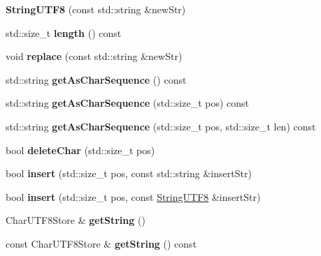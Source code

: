 \begin{DoxyCompactItemize}
{\bfseries String\+U\+T\+F8} (const std\+::string \&new\+Str)
\item 
\mbox{\label{classStringUtils_1_1StringUTF8_a6f80c06b04e4954beafcd93e1f817b43}} 
std\+::size\+\_\+t {\bfseries length} () const
\item 
\mbox{\label{classStringUtils_1_1StringUTF8_aa22f0f8d7851e83f3fe742b08829b0fd}} 
void {\bfseries replace} (const std\+::string \&new\+Str)
\item 
\mbox{\label{classStringUtils_1_1StringUTF8_a95e853e98fd631a912c2364ecb97e94d}} 
std\+::string {\bfseries get\+As\+Char\+Sequence} () const
\item 
\mbox{\label{classStringUtils_1_1StringUTF8_af4918f9c9d489ae5ee522dcfc1b6013f}} 
std\+::string {\bfseries get\+As\+Char\+Sequence} (std\+::size\+\_\+t pos) const
\item 
\mbox{\label{classStringUtils_1_1StringUTF8_a96ef87d3ff9d0847a4053ef5bdee0bf6}} 
std\+::string {\bfseries get\+As\+Char\+Sequence} (std\+::size\+\_\+t pos, std\+::size\+\_\+t len) const
\item 
\mbox{\label{classStringUtils_1_1StringUTF8_a7bc7fa3962cfbe4bfe08f1ab5f3a521e}} 
bool {\bfseries delete\+Char} (std\+::size\+\_\+t pos)
\item 
\mbox{\label{classStringUtils_1_1StringUTF8_a6d0ff54dc1dc23df844252b175bfdc9f}} 
bool {\bfseries insert} (std\+::size\+\_\+t pos, const std\+::string \&insert\+Str)
\item 
\mbox{\label{classStringUtils_1_1StringUTF8_a2e09405cd941e199eba8743cdb6dd8eb}} 
bool {\bfseries insert} (std\+::size\+\_\+t pos, const \hyperlink{classStringUtils_1_1StringUTF8}{String\+U\+T\+F8} \&insert\+Str)
\item 
\mbox{\label{classStringUtils_1_1StringUTF8_ad05127c1730bac29164785c476d9ef96}} 
Char\+U\+T\+F8\+Store \& {\bfseries get\+String} ()
\item 
\mbox{\label{classStringUtils_1_1StringUTF8_a8156d1478ae9d2d41203d19145da6140}} 
const Char\+U\+T\+F8\+Store \& {\bfseries get\+String} () const
\end{DoxyCompactItemize}


